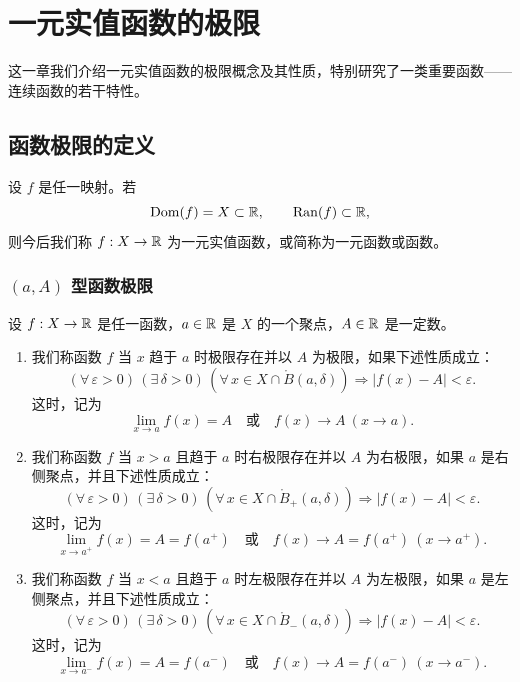 \chapter{一元实值函数的极限}

这一章我们介绍一元实值函数的极限概念及其性质，特别研究了一类重要函数——连续函数的若干特性。

\section{函数极限的定义}

设 \(f\) 是任一映射。若
\[
\operatorname{Dom}(f)=X\subset\mathbb{R},\qquad \operatorname{Ran}(f)\subset\mathbb{R},
\]
则今后我们称 \(f:X\to\mathbb{R}\) 为一元实值函数，或简称为一元函数或函数。

\subsection{\texorpdfstring{\((a,A)\) 型函数极限}{(a,A) 型函数极限}}
	\label{sec:4-1-1}

\begin{mydef*}{}

	设 \(f:X\to\mathbb{R}\) 是任一函数，\(a\in\mathbb{R}\) 是 \(X\) 的一个聚点，\(A\in\mathbb{R}\) 是一定数。

	\begin{enumerate}[label=\arabic*)]
		\item 我们称函数 \(f\) 当 \(x\) 趋于 \(a\) 时极限存在并以 \(A\) 为极限，如果下述性质成立：
		\[
		(\forall\,\varepsilon>0)\,(\exists\,\delta>0)\,(\forall\,x\in X\cap\mathring{B}(a,\delta))\Longrightarrow |f(x)-A|<\varepsilon.
		\]
		这时，记为
		\[
		\lim_{x\to a}f(x)=A \quad\text{或}\quad f(x)\to A\ (x\to a).
		\]

		\item 我们称函数 \(f\) 当 \(x>a\) 且趋于 \(a\) 时右极限存在并以 \(A\) 为右极限，如果 \(a\) 是右侧聚点，并且下述性质成立：
		\[
		(\forall\,\varepsilon>0)\,(\exists\,\delta>0)\,(\forall\,x\in X\cap\mathring{B}_+(a,\delta))\Longrightarrow |f(x)-A|<\varepsilon.
		\]
		这时，记为
		\[
		\lim_{x\to a^+}f(x)=A=f(a^+) \quad\text{或}\quad f(x)\to A=f(a^+)\ (x\to a^+).
		\]

		\item 我们称函数 \(f\) 当 \(x<a\) 且趋于 \(a\) 时左极限存在并以 \(A\) 为左极限，如果 \(a\) 是左侧聚点，并且下述性质成立：
		\[
		(\forall\,\varepsilon>0)\,(\exists\,\delta>0)\,(\forall\,x\in X\cap\mathring{B}_-(a,\delta))\Longrightarrow |f(x)-A|<\varepsilon.
		\]
		这时，记为
		\[
		\lim_{x\to a^-}f(x)=A=f(a^-) \quad\text{或}\quad f(x)\to A=f(a^-)\ (x\to a^-).
		\]
	\end{enumerate}

\end{mydef*}

